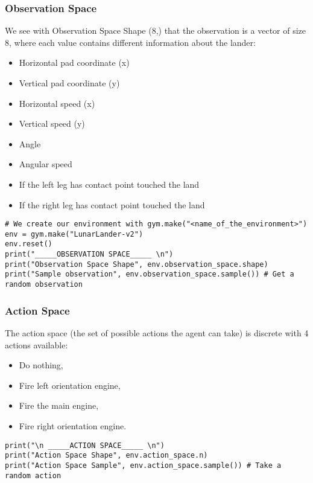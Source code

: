 \begin{frame}[fragile]\frametitle{Observation Space}

We see with Observation Space Shape (8,) that the observation is a vector of size 8, where each value contains different information about the lander:

\begin{itemize}
\item Horizontal pad coordinate (x)
\item Vertical pad coordinate (y)
\item Horizontal speed (x)
\item Vertical speed (y)
\item Angle
\item Angular speed
\item If the left leg has contact point touched the land
\item If the right leg has contact point touched the land
\end{itemize}

\begin{lstlisting}
# We create our environment with gym.make("<name_of_the_environment>")
env = gym.make("LunarLander-v2")
env.reset()
print("_____OBSERVATION SPACE_____ \n")
print("Observation Space Shape", env.observation_space.shape)
print("Sample observation", env.observation_space.sample()) # Get a random observation
\end{lstlisting}

\end{frame}

\begin{frame}[fragile]\frametitle{Action Space}

The action space (the set of possible actions the agent can take) is discrete with 4 actions available:

\begin{itemize}
\item Do nothing,
\item Fire left orientation engine,
\item Fire the main engine,
\item Fire right orientation engine.
\end{itemize}

\begin{lstlisting}
print("\n _____ACTION SPACE_____ \n")
print("Action Space Shape", env.action_space.n)
print("Action Space Sample", env.action_space.sample()) # Take a random action
\end{lstlisting}

\end{frame}

